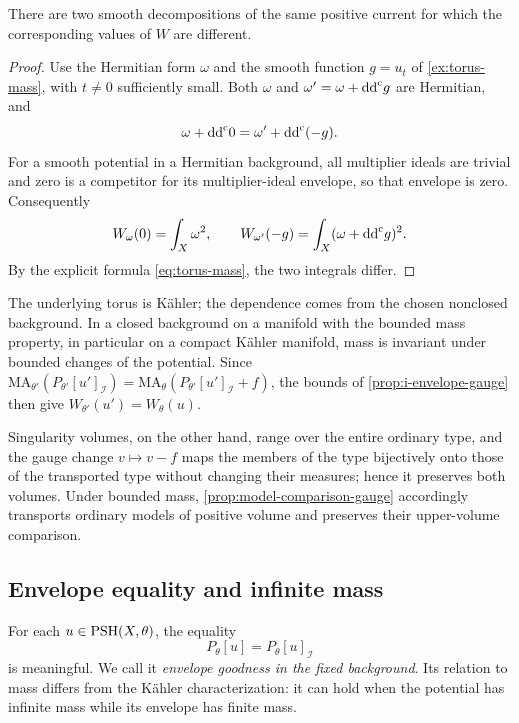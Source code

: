 \begin{proposition}\label{prop:raw-i-volume-gauge-failure}
There are two smooth decompositions of the same positive current for which the corresponding values of $W$ are different.
\end{proposition}
\begin{proof}
Use the Hermitian form $\omega$ and the smooth function $g=u_t$ of \cref{ex:torus-mass}, with $t\ne0$ sufficiently small. Both $\omega$ and $\omega'=\omega+\mathrm{dd}^{\mathrm{c}} g$ are Hermitian, and
\[
 \omega+\mathrm{dd}^{\mathrm{c}}0=\omega'+\mathrm{dd}^{\mathrm{c}}(-g).
\]
For a smooth potential in a Hermitian background, all multiplier ideals are trivial and zero is a competitor for its multiplier-ideal envelope, so that envelope is zero. Consequently
\[
 W_\omega(0)=\int_X\omega^2,\qquad
 W_{\omega'}(-g)=\int_X(\omega+\mathrm{dd}^{\mathrm{c}} g)^2.
\]
By the explicit formula \eqref{eq:torus-mass}, the two integrals differ.
\end{proof}

The underlying torus is K\"ahler; the dependence comes from the chosen nonclosed background. In a closed background on a manifold with the bounded mass property, in particular on a compact K\"ahler manifold, mass is invariant under bounded changes of the potential. Since $\mathrm{MA}_{\theta'}(P_{\theta'}[u']_{\mathcal I})=\mathrm{MA}_\theta(P_{\theta'}[u']_{\mathcal I}+f)$, the bounds of \cref{prop:i-envelope-gauge} then give $W_{\theta'}(u')=W_\theta(u)$.

Singularity volumes, on the other hand, range over the entire ordinary type, and the gauge change $v\mapsto v-f$ maps the members of the type bijectively onto those of the transported type without changing their measures; hence it preserves both volumes. Under bounded mass, \cref{prop:model-comparison-gauge} accordingly transports ordinary models of positive volume and preserves their upper-volume comparison.

\subsection{Envelope equality and infinite mass}

For each $u\in\mathrm{PSH}(X,\theta)$, the equality
\begin{equation}\label{eq:background-goodness}
 P_\theta[u]=P_\theta[u]_{\mathcal I}
\end{equation}
is meaningful. We call it \emph{envelope goodness in the fixed background}. Its relation to mass differs from the K\"ahler characterization: it can hold when the potential has infinite mass while its envelope has finite mass.

